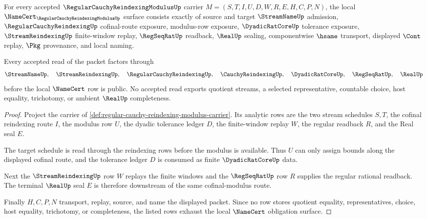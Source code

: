\begin{theorem}
\label{thm:regular-cauchy-reindexing-modulus-namecert-obligations}
For every accepted $\RegularCauchyReindexingModulusUp$ carrier $M=(S,T,I,U,D,W,R,E,H,C,P,N)$, the local $\NameCert_{\RegularCauchyReindexingModulusUp}$ surface consists exactly of source and target $\StreamNameUp$ admission, $\RegularCauchyReindexingUp$ cofinal-route exposure, modulus-row exposure, $\DyadicRatCoreUp$ tolerance exposure, $\StreamReindexingUp$ finite-window replay, $\RegSeqRatUp$ readback, $\RealUp$ sealing, componentwise $\hsame$ transport, displayed $\Cont$ replay, $\Pkg$ provenance, and local naming.

Every accepted read of the packet factors through
$$
\StreamNameUp,\quad \StreamReindexingUp,\quad \RegularCauchyReindexingUp,\quad \CauchyReindexingUp,\quad \DyadicRatCoreUp,\quad \RegSeqRatUp,\quad \RealUp
$$
before the local $\NameCert$ row is public. No accepted read exports quotient streams, a selected representative, countable choice, host equality, trichotomy, or ambient $\RealUp$ completeness.
\end{theorem}
\begin{proof}
Project the carrier of \autoref{def:regular-cauchy-reindexing-modulus-carrier}. Its analytic rows are the two stream schedules $S,T$, the cofinal reindexing route $I$, the modulus row $U$, the dyadic tolerance ledger $D$, the finite-window replay $W$, the regular readback $R$, and the Real seal $E$.

The target schedule is read through the reindexing rows before the modulus is available. Thus $U$ can only assign bounds along the displayed cofinal route, and the tolerance ledger $D$ is consumed as finite $\DyadicRatCoreUp$ data.

Next the $\StreamReindexingUp$ row $W$ replays the finite windows and the $\RegSeqRatUp$ row $R$ supplies the regular rational readback. The terminal $\RealUp$ seal $E$ is therefore downstream of the same cofinal-modulus route.

Finally $H,C,P,N$ transport, replay, source, and name the displayed packet. Since no row stores quotient equality, representatives, choice, host equality, trichotomy, or completeness, the listed rows exhaust the local $\NameCert$ obligation surface.
\end{proof}


